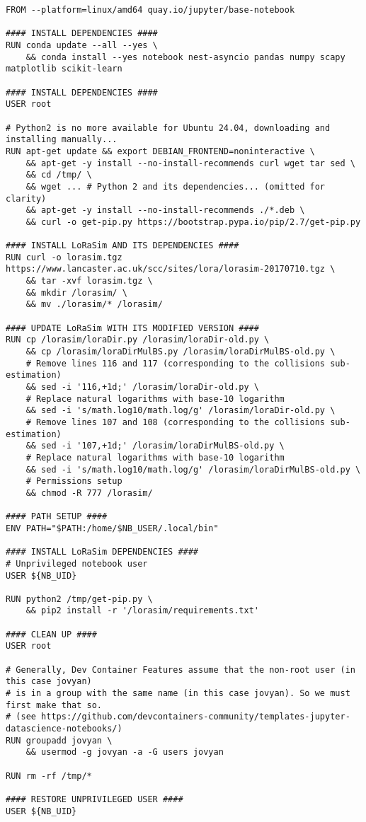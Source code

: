 \documentclass[a4paper,11pt]{article} %
\begin{document}
    \begin{verbatim}
FROM --platform=linux/amd64 quay.io/jupyter/base-notebook

#### INSTALL DEPENDENCIES ####
RUN conda update --all --yes \
    && conda install --yes notebook nest-asyncio pandas numpy scapy matplotlib scikit-learn

#### INSTALL DEPENDENCIES ####
USER root

# Python2 is no more available for Ubuntu 24.04, downloading and installing manually...
RUN apt-get update && export DEBIAN_FRONTEND=noninteractive \
    && apt-get -y install --no-install-recommends curl wget tar sed \
    && cd /tmp/ \
    && wget ... # Python 2 and its dependencies... (omitted for clarity)
    && apt-get -y install --no-install-recommends ./*.deb \
    && curl -o get-pip.py https://bootstrap.pypa.io/pip/2.7/get-pip.py

#### INSTALL LoRaSim AND ITS DEPENDENCIES ####
RUN curl -o lorasim.tgz https://www.lancaster.ac.uk/scc/sites/lora/lorasim-20170710.tgz \
    && tar -xvf lorasim.tgz \
    && mkdir /lorasim/ \
    && mv ./lorasim/* /lorasim/

#### UPDATE LoRaSim WITH ITS MODIFIED VERSION ####
RUN cp /lorasim/loraDir.py /lorasim/loraDir-old.py \
    && cp /lorasim/loraDirMulBS.py /lorasim/loraDirMulBS-old.py \
    # Remove lines 116 and 117 (corresponding to the collisions sub-estimation)
    && sed -i '116,+1d;' /lorasim/loraDir-old.py \
    # Replace natural logarithms with base-10 logarithm
    && sed -i 's/math.log10/math.log/g' /lorasim/loraDir-old.py \
    # Remove lines 107 and 108 (corresponding to the collisions sub-estimation)
    && sed -i '107,+1d;' /lorasim/loraDirMulBS-old.py \
    # Replace natural logarithms with base-10 logarithm
    && sed -i 's/math.log10/math.log/g' /lorasim/loraDirMulBS-old.py \
    # Permissions setup
    && chmod -R 777 /lorasim/

#### PATH SETUP ####
ENV PATH="$PATH:/home/$NB_USER/.local/bin"

#### INSTALL LoRaSim DEPENDENCIES ####
# Unprivileged notebook user
USER ${NB_UID}

RUN python2 /tmp/get-pip.py \
    && pip2 install -r '/lorasim/requirements.txt'

#### CLEAN UP ####
USER root

# Generally, Dev Container Features assume that the non-root user (in this case jovyan)
# is in a group with the same name (in this case jovyan). So we must first make that so.
# (see https://github.com/devcontainers-community/templates-jupyter-datascience-notebooks/)
RUN groupadd jovyan \
    && usermod -g jovyan -a -G users jovyan

RUN rm -rf /tmp/*

#### RESTORE UNPRIVILEGED USER ####
USER ${NB_UID}
    \end{verbatim}
\end{document}
